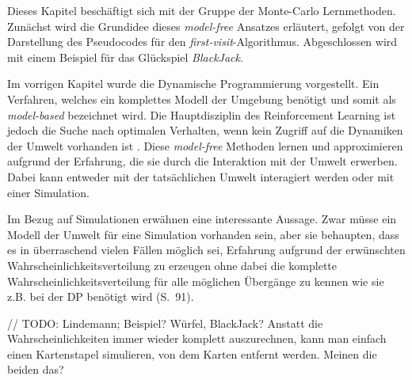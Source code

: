Dieses Kapitel beschäftigt sich mit der Gruppe der Monte-Carlo Lernmethoden. Zunächst wird die Grundidee dieses \textit{model-free} Ansatzes erläutert, gefolgt von der Darstellung des Pseudocodes für den \textit{first-visit}-Algorithmus. Abgeschlossen wird mit einem Beispiel für das Glückspiel \textit{BlackJack}.
\par 

Im vorrigen Kapitel wurde die Dynamische Programmierung vorgestellt. Ein Verfahren, welches ein komplettes Modell der Umgebung benötigt und somit als \textit{model-based} bezeichnet wird. Die Hauptdisziplin des Reinforcement Learning ist jedoch die Suche nach optimalen Verhalten, wenn kein Zugriff auf die Dynamiken der Umwelt vorhanden ist \cite[S.~27]{Wiering}. Diese \textit{model-free} Methoden lernen und approximieren aufgrund der Erfahrung, die sie durch die Interaktion mit der Umwelt erwerben. Dabei kann entweder mit der tatsächlichen Umwelt interagiert werden oder mit einer Simulation.
\par 
Im Bezug auf Simulationen erwähnen \cite{Sutton1998} eine interessante Aussage. Zwar müsse ein Modell der Umwelt für eine Simulation vorhanden sein, aber sie behaupten, dass es in überraschend vielen Fällen möglich sei, Erfahrung aufgrund der erwünschten Wahrscheinlichkeitsverteilung zu erzeugen ohne dabei die komplette Wahrscheinlichkeitsverteilung für alle möglichen Übergänge zu kennen wie sie z.B. bei der DP benötigt wird (S.~91).
\par 
// TODO: Lindemann; Beispiel? Würfel, BlackJack? Anstatt die Wahrscheinlichkeiten immer wieder komplett auszurechnen, kann man einfach einen Kartenstapel simulieren, von dem Karten entfernt werden. Meinen die beiden das?
\par 

